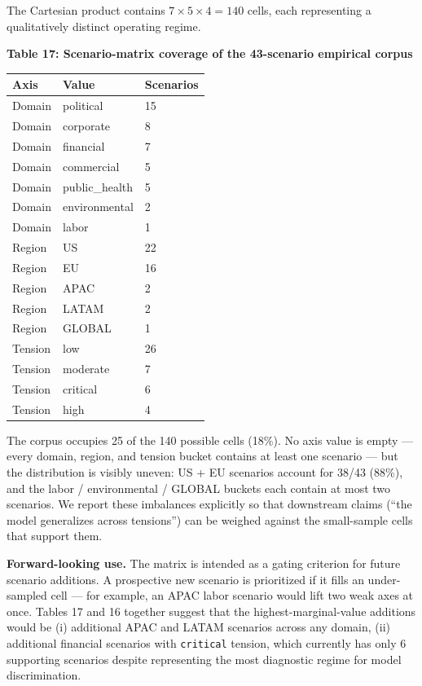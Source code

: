 \documentclass[
]{article}
\begin{document}
The Cartesian product contains \(7 \times 5 \times 4 = 140\) cells, each
representing a qualitatively distinct operating regime.

\textbf{Table 17: Scenario-matrix coverage of the 43-scenario empirical
corpus}

\begin{longtable}[]{@{}lll@{}}
\toprule\noalign{}
Axis & Value & Scenarios \\
\midrule\noalign{}
\endhead
\bottomrule\noalign{}
\endlastfoot
Domain & political & 15 \\
Domain & corporate & 8 \\
Domain & financial & 7 \\
Domain & commercial & 5 \\
Domain & public\_health & 5 \\
Domain & environmental & 2 \\
Domain & labor & 1 \\
Region & US & 22 \\
Region & EU & 16 \\
Region & APAC & 2 \\
Region & LATAM & 2 \\
Region & GLOBAL & 1 \\
Tension & low & 26 \\
Tension & moderate & 7 \\
Tension & critical & 6 \\
Tension & high & 4 \\
\end{longtable}

The corpus occupies 25 of the 140 possible cells (18\%). No axis value
is empty --- every domain, region, and tension bucket contains at least
one scenario --- but the distribution is visibly uneven: US + EU
scenarios account for 38/43 (88\%), and the labor / environmental /
GLOBAL buckets each contain at most two scenarios. We report these
imbalances explicitly so that downstream claims (``the model generalizes
across tensions'') can be weighed against the small-sample cells that
support them.

\textbf{Forward-looking use.} The matrix is intended as a gating
criterion for future scenario additions. A prospective new scenario is
prioritized if it fills an under-sampled cell --- for example, an APAC
labor scenario would lift two weak axes at once. Tables 17 and 16
together suggest that the highest-marginal-value additions would be (i)
additional APAC and LATAM scenarios across any domain, (ii) additional
financial scenarios with \texttt{critical} tension, which currently has
only 6 supporting scenarios despite representing the most diagnostic
regime for model discrimination.
\end{document}
